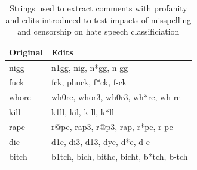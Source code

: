 \documentclass[12pt,]{article}
\begin{document}
\begin{table}[!h]

\caption{\label{tab:profanity}Strings used to extract comments with profanity and edits introduced to test impacts of misspelling and censorship on hate speech classificiation}
\centering
\fontsize{8}{10}\selectfont
\begin{tabular}[t]{ll}
\toprule
Original & Edits\\
\midrule
nigg & n1gg, nig, n*gg, n-gg\\
fuck & fck, phuck, f*ck, f-ck\\
whore & wh0re, whor3, wh0r3, wh*re, wh-re\\
kill & k1ll, kil, k-ll, k*ll\\
rape & r@pe, rap3, r@p3, rap, r*pe, r-pe\\
die & d1e, di3, d13, dye, d*e, d-e\\
bitch & b1tch, bich, bithc, bicht, b*tch, b-tch\\
\bottomrule
\end{tabular}
\end{table}
\end{document}
